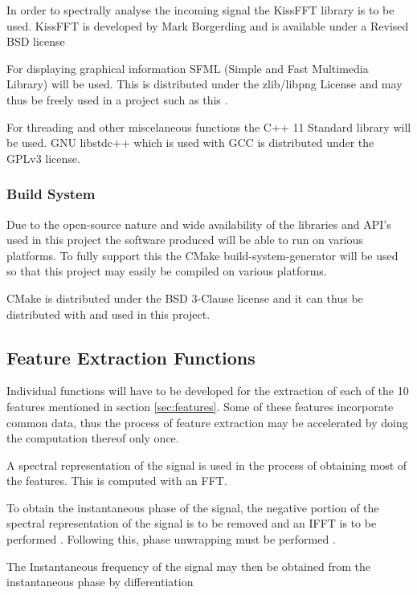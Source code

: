 \documentclass[10pt,twocolumn]{witseiepaper}
\begin{document}
			In order to spectrally analyse the incoming signal the KissFFT library is to be used. KissFFT is developed by Mark Borgerding and is available under a Revised BSD license \cite{kissfft_license}

			For displaying graphical information SFML (Simple and Fast Multimedia Library) will be used. This is distributed under the zlib/libpng License and may thus be freely used in a project such as this \cite{sfml_license}.

			For threading and other miscelaneous functions the C++ 11 Standard library will be used. GNU libstdc++ which is used with GCC is distributed under the GPLv3 license.

		\subsubsection{Build System}
			Due to the open-source nature and wide availability of the libraries and API's used in this project the software produced will be able to run on various platforms. To fully support this the CMake build-system-generator will be used so that this project may easily be compiled on various platforms.

			CMake is distributed under the BSD 3-Clause license \cite{cmake_license} and it can thus be distributed with and used in this project.

		\subsection{Feature Extraction Functions}
			Individual functions will have to be developed for the extraction of each of the 10 features mentioned in section \ref{sec:features}. Some of these features incorporate common data, thus the process of feature extraction may be accelerated by doing the computation thereof only once.

			A spectral representation of the signal is used in the process of obtaining most of the features. This is computed with an FFT. 
			
			To obtain the instantaneous phase of the signal, the negative portion of the spectral representation of the signal is to be removed and an IFFT is to be performed \cite{picinbono1997instantaneous}. Following this, phase unwrapping must be performed \cite{park2009introduction, picinbono1997instantaneous}.

			The Instantaneous frequency of the signal may then be obtained from the instantaneous phase by differentiation \cite{park2009introduction}
\end{document}
